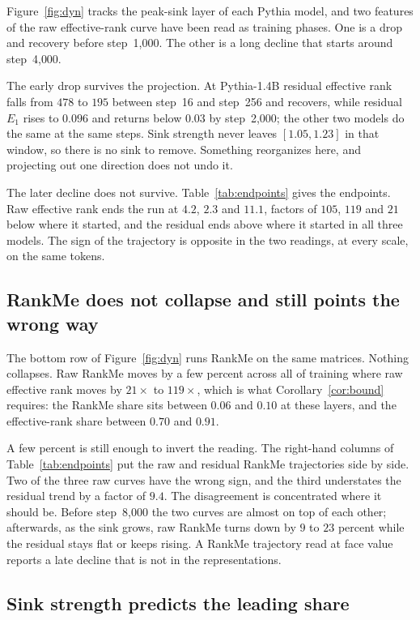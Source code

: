 \documentclass{article}
\theoremstyle{spaced}
\theoremstyle{definition}
\begin{document}
Figure~\ref{fig:dyn} tracks the peak-sink layer of each Pythia model, and two features of the raw effective-rank curve have been read as training phases. One is a drop and recovery before step~1{,}000. The other is a long decline that starts around step~4{,}000.

The early drop survives the projection. At Pythia-1.4B residual effective rank falls from $478$ to $195$ between step~16 and step~256 and recovers, while residual $E_1$ rises to $0.096$ and returns below $0.03$ by step~2{,}000; the other two models do the same at the same steps. Sink strength never leaves $[1.05, 1.23]$ in that window, so there is no sink to remove. Something reorganizes here, and projecting out one direction does not undo it.

The later decline does not survive. Table~\ref{tab:endpoints} gives the endpoints. Raw effective rank ends the run at $4.2$, $2.3$ and $11.1$, factors of $105$, $119$ and $21$ below where it started, and the residual ends above where it started in all three models. The sign of the trajectory is opposite in the two readings, at every scale, on the same tokens.

\subsection{RankMe does not collapse and still points the wrong way}

The bottom row of Figure~\ref{fig:dyn} runs RankMe on the same matrices. Nothing collapses. Raw RankMe moves by a few percent across all of training where raw effective rank moves by $21\times$ to $119\times$, which is what Corollary~\ref{cor:bound} requires: the RankMe share sits between $0.06$ and $0.10$ at these layers, and the effective-rank share between $0.70$ and $0.91$.

A few percent is still enough to invert the reading. The right-hand columns of Table~\ref{tab:endpoints} put the raw and residual RankMe trajectories side by side. Two of the three raw curves have the wrong sign, and the third understates the residual trend by a factor of $9.4$. The disagreement is concentrated where it should be. Before step~8{,}000 the two curves are almost on top of each other; afterwards, as the sink grows, raw RankMe turns down by $9$ to $23$ percent while the residual stays flat or keeps rising. A RankMe trajectory read at face value reports a late decline that is not in the representations.

\subsection{Sink strength predicts the leading share}
\end{document}
